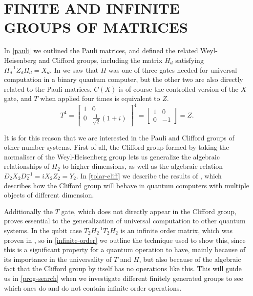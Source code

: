 
\chapter[FINITE AND INFINITE GROUPS OF MATRICES]{FINITE AND INFINITE GROUPS OF MATRICES}\label{finite-gen}

In \autoref{pauli} we outlined the Pauli matrices, and defined the related Weyl-Heisenberg and Clifford groups, including the matrix $H_d$ satisfying $H_d^{-1}Z_dH_d = X_d$. In \cite{universal-qubit} we saw that $H$ was one of three gates needed for universal computation in a binary quantum computer, but the other two are also directly related to the Pauli matrices. $C(X)$ is of course the controlled version of the $X$ gate, and $T$ when applied four times is equivalent to $Z$.
\[
T^4 = \left[\begin{matrix}
	1 & 0 \\
	0 & \frac{1}{\sqrt{2}}(1+i)
\end{matrix}\right]^4 = \left[\begin{matrix}
	1 & 0 \\
	0 & -1
\end{matrix}\right] = Z.\]

It is for this reason that we are interested in the Pauli and Clifford groups of other number systems. 
First of all, the Clifford group formed by taking the normaliser of the Weyl-Heisenberg group lets us generalize the algebraic relationships of $H_2$ to higher dimensions, as well as the algebraic relation $D_2X_2D_2^{-1} = iX_2Z_2 = Y_2$. In \autoref{tolar-cliff} we describe the results of \cite{tolar-clifford}, which describes how the Clifford group will behave in quantum computers with multiple objects of different dimension.

Additionally the $T$ gate, which does not directly appear in the Clifford group, proves essential to the generalization of universal computation to other quantum systems. In the qubit case $T_2H_2^{-1}T_2H_2$ is an infinite order matrix, which was proven in \cite{universal-qubit}, so in \autoref{infinite-order} we outline the technique used to show this, since this is a significant property for a quantum operation to have, mainly because of its importance in the universality of $T$ and $H$, but also because of the algebraic fact that the Clifford group by itself has no operations like this. This will guide us in \autoref{prog-search} when we investigate different finitely generated groups to see which ones do and do not contain infinite order operations.
